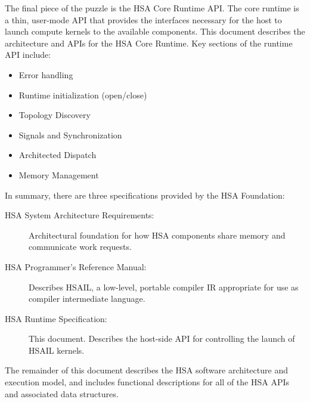 \documentclass[final]{book}
\begin{document}
The final piece of the puzzle is the HSA Core Runtime API. The core runtime is
a thin, user-mode API that provides the interfaces necessary for the host to
launch compute kernels to the available components. This document describes the
architecture and APIs for the HSA Core Runtime. Key sections of the runtime API
include:
\begin{itemize}
\item Error handling
\item Runtime initialization (open/close)
\item Topology Discovery
\item Signals and Synchronization
\item Architected Dispatch
\item Memory Management
\end{itemize}
In summary, there are three specifications provided by the HSA
Foundation:
\begin{description}
\item[HSA System Architecture Requirements:] Architectural foundation for
how HSA components share memory and communicate work requests.
\item[HSA Programmer's Reference Manual:] Describes HSAIL, a low-level,
portable compiler IR appropriate for use as compiler intermediate
language.
\item[HSA Runtime Specification:] This document. Describes the host-side
API for controlling the launch of HSAIL kernels.
\end{description}

The remainder of this document describes the HSA software architecture and
execution model, and includes functional descriptions for all of the HSA APIs
and associated data structures.
\end{document}
